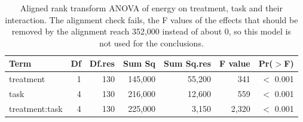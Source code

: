 \begin{table}[ht]
\centering
\caption{Aligned rank transform ANOVA of energy on treatment, task and their interaction. The alignment check fails, the F values of the effects that should be removed by the alignment reach 352,000 instead of about 0, so this model is not used for the conclusions.} 
\label{tab:07_art_anova_energy}
\begingroup\small
\begin{tabular}{lrrrrrr}
  \toprule
Term & Df & Df.res & Sum Sq & Sum Sq.res & F value & Pr($>$F) \\ 
  \midrule
treatment & 1 & 130 & 145,000 & 55,200 & 341 & $<$ 0.001 \\ 
  task & 4 & 130 & 216,000 & 12,600 & 559 & $<$ 0.001 \\ 
  treatment:task & 4 & 130 & 225,000 & 3,150 & 2,320 & $<$ 0.001 \\ 
   \bottomrule
\end{tabular}
\endgroup
\end{table}

